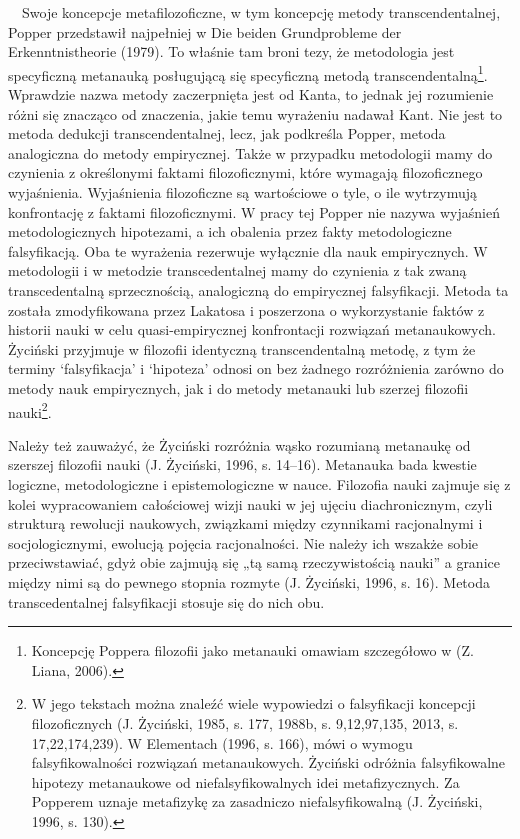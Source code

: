 \documentclass{article}
\begin{document}
\ \ Swoje koncepcje metafilozoficzne, w tym koncepcję metody transcendentalnej, Popper przedstawił najpełniej w Die
beiden Grundprobleme der Erkenntnistheorie \label{ref:RNDZjoA35m8Sx}(1979). To właśnie tam broni tezy, że metodologia
jest specyficzną metanauką posługującą się specyficzną metodą transcendentalną\footnote{Koncepcję Poppera filozofii
jako metanauki omawiam szczegółowo w \label{ref:RNDfY6Fw7eCi8}(Z. Liana, 2006).}. Wprawdzie nazwa metody zaczerpnięta
jest od Kanta, to jednak jej rozumienie różni się znacząco od znaczenia, jakie temu wyrażeniu nadawał Kant. Nie jest to
metoda dedukcji transcendentalnej, lecz, jak podkreśla Popper, metoda analogiczna do metody empirycznej. Także w
przypadku metodologii mamy do czynienia z określonymi faktami filozoficznymi, które wymagają filozoficznego
wyjaśnienia. Wyjaśnienia filozoficzne są wartościowe o tyle, o ile wytrzymują konfrontację z faktami filozoficznymi. W
pracy tej Popper nie nazywa wyjaśnień metodologicznych hipotezami, a ich obalenia przez fakty metodologiczne
falsyfikacją. Oba te wyrażenia rezerwuje wyłącznie dla nauk empirycznych. W metodologii i w metodzie transcedentalnej
mamy do czynienia z tak zwaną transcedentalną sprzecznością, analogiczną do empirycznej falsyfikacji. Metoda ta została
zmodyfikowana przez Lakatosa i poszerzona o wykorzystanie faktów z historii nauki w celu quasi-empirycznej konfrontacji
rozwiązań metanaukowych. Życiński przyjmuje w filozofii identyczną transcendentalną metodę, z tym że terminy
‘falsyfikacja’ i ‘hipoteza’ odnosi on bez żadnego rozróżnienia zarówno do metody nauk empirycznych, jak i do metody
metanauki lub szerzej filozofii nauki\footnote{W jego tekstach można znaleźć wiele wypowiedzi o falsyfikacji koncepcji
filozoficznych \label{ref:RNDlMUuFKby8S}(J. Życiński, 1985, s. 177, 1988b, s. 9,12,97,135, 2013, s. 17,22,174,239).  W
Elementach \label{ref:RNDCkkQxwcbWF}(1996, s. 166), mówi o wymogu falsyfikowalności rozwiązań metanaukowych. Życiński
odróżnia falsyfikowalne hipotezy metanaukowe od niefalsyfikowalnych idei metafizycznych. Za Popperem uznaje metafizykę
za zasadniczo niefalsyfikowalną \label{ref:RNDA2elxmxDEm}(J. Życiński, 1996, s. 130).}.

Należy też zauważyć, że Życiński rozróżnia wąsko rozumianą metanaukę od szerszej filozofii nauki
\label{ref:RNDSXNKAbqry1}(J. Życiński, 1996, s. 14–16). Metanauka bada kwestie logiczne, metodologiczne i
epistemologiczne w nauce. Filozofia nauki zajmuje się z kolei wypracowaniem całościowej wizji nauki w jej ujęciu
diachronicznym, czyli strukturą rewolucji naukowych, związkami między czynnikami racjonalnymi i socjologicznymi,
ewolucją pojęcia racjonalności. Nie należy ich wszakże sobie przeciwstawiać, gdyż obie zajmują się „tą samą
rzeczywistością nauki” a granice między nimi są do pewnego stopnia rozmyte \label{ref:RNDJqZXflfCwo}(J. Życiński, 1996,
s. 16). Metoda transcedentalnej falsyfikacji stosuje się do nich obu.
\end{document}

